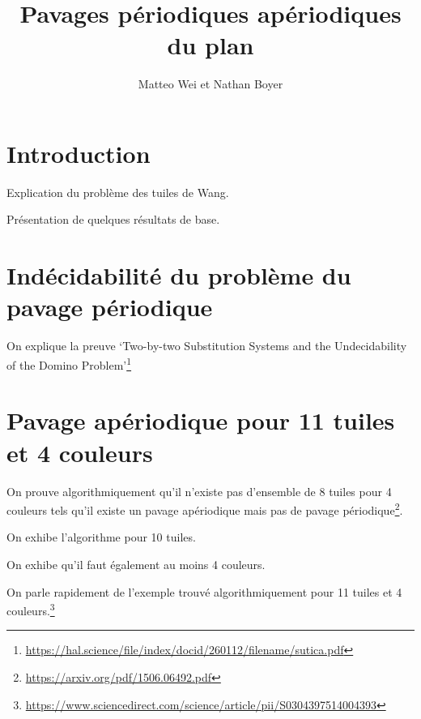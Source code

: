 \documentclass{scrartcl}
\title{Pavages périodiques apériodiques du plan}
\author{Matteo Wei et Nathan Boyer}
\begin{document}
    
    \maketitle

    \section*{Introduction}

    Explication du problème des tuiles de Wang.

    Présentation de quelques résultats de base.

    \section{Indécidabilité du problème du pavage périodique}

    On explique la preuve `Two-by-two Substitution Systems and the Undecidability of the Domino Problem'\footnote[1]{\url{https://hal.science/file/index/docid/260112/filename/sutica.pdf}}

    \section{Pavage apériodique pour 11 tuiles et 4 couleurs}

    On prouve algorithmiquement qu'il n'existe pas d'ensemble de 8 tuiles pour 4 couleurs tels qu'il existe un pavage
    apériodique mais pas de pavage périodique\footnote[2]{\url{https://arxiv.org/pdf/1506.06492.pdf}}.

    On exhibe l'algorithme pour 10 tuiles.

    On exhibe qu'il faut également au moins 4 couleurs.

    On parle rapidement de l'exemple trouvé algorithmiquement pour 11 tuiles et 4 couleurs.\footnote[3]{\url{https://www.sciencedirect.com/science/article/pii/S0304397514004393}}
\end{document}
